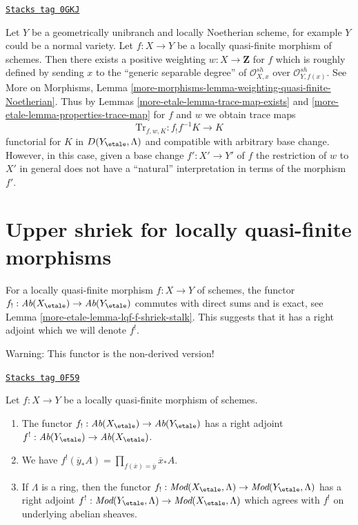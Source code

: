 \begin{example}

\label{more-etale-example-trace-for-quasi-finite-over-normal}
\href{https://stacks.math.columbia.edu/tag/0GKJ}{\texttt{Stacks tag 0GKJ}}

Let $Y$ be a geometrically unibranch and locally Noetherian scheme,
for example $Y$ could be a normal variety. Let $f : X \to Y$ be a locally
quasi-finite morphism of schemes. Then there exists a
positive weighting $w : X \to \mathbf{Z}$ for $f$
which is roughly defined by sending $x$ to the
``generic separable degree''
of $\mathcal{O}_{X, x}^{sh}$ over $\mathcal{O}_{Y, f(x)}^{sh}$.
See More on Morphisms, Lemma
\ref{more-morphisms-lemma-weighting-quasi-finite-Noetherian}.
Thus by Lemmas \ref{more-etale-lemma-trace-map-exists} and
\ref{more-etale-lemma-properties-trace-map} for $f$ and $w$ we obtain trace maps
$$
\text{Tr}_{f, w, K} : f_!f^{-1}K \longrightarrow K
$$
functorial for $K$ in $D(Y_\etale, \Lambda)$ and compatible
with arbitrary base change. However, in this case, given a base change
$f' : X' \to Y'$ of $f$ the restriction of $w$ to $X'$ in general
does not have a ``natural'' interpretation in terms of the
morphism $f'$.
\end{example}

\section{Upper shriek for locally quasi-finite morphisms}
\label{more-etale-section-duality-locally-quasi-finite}
For a locally quasi-finite morphism $f : X \to Y$ of schemes, the
functor $f_! : \textit{Ab}(X_\etale) \to \textit{Ab}(Y_\etale)$ commutes
with direct sums and is exact, see Lemma \ref{more-etale-lemma-lqf-f-shriek-stalk}.
This suggests that it has a right adjoint which we will denote $f^!$.

\medskip\noindent
Warning: This functor is the non-derived version!

\begin{lemma}
\label{more-etale-lemma-lqf-f-upper-shriek}
\href{https://stacks.math.columbia.edu/tag/0F59}{\texttt{Stacks tag 0F59}}

Let $f : X \to Y$ be a locally quasi-finite morphism of schemes.
\begin{enumerate}
\item The functor $f_! : \textit{Ab}(X_\etale) \to \textit{Ab}(Y_\etale)$
has a right adjoint $f^! : \textit{Ab}(Y_\etale) \to \textit{Ab}(X_\etale)$.
\item We have
$f^!(\overline{y}_*A) = \prod_{f(\overline{x}) = \overline{y}} \overline{x}_*A$.
\item If $\Lambda$ is a ring, then the functor
$f_! : \textit{Mod}(X_\etale, \Lambda) \to \textit{Mod}(Y_\etale, \Lambda)$
has a right adjoint
$f^! : \textit{Mod}(Y_\etale, \Lambda) \to \textit{Mod}(X_\etale, \Lambda)$
which agrees with $f^!$ on underlying abelian sheaves.
\end{enumerate}
\end{lemma}

